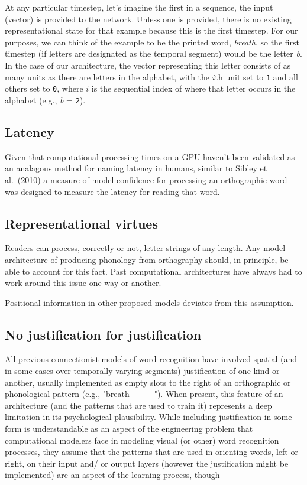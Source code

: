 \documentclass[
  american,
  man,floatsintext]{apa6}
\begin{document}
At any particular timestep, let's imagine the first in a sequence, the input (vector) is provided to the network. Unless one is provided, there is no existing representational state for that example because this is the first timestep. For our purposes, we can think of the example to be the printed word, \emph{breath}, so the first timestep (if letters are designated as the temporal segment) would be the letter \emph{b}. In the case of our architecture, the vector representing this letter consists of as many units as there are letters in the alphabet, with the \(i\)th unit set to \texttt{1} and all others set to \texttt{0}, where \(i\) is the sequential index of where that letter occurs in the alphabet (e.g., \emph{b} = \texttt{2}).

\hypertarget{latency}{%
\subsection{Latency}\label{latency}}

Given that computational processing times on a GPU haven't been validated as an analagous method for naming latency in humans, similar to Sibley et al.~(2010) a measure of model confidence for processing an orthographic word was designed to measure the latency for reading that word.

\hypertarget{representational-virtues}{%
\subsection{Representational virtues}\label{representational-virtues}}

Readers can process, correctly or not, letter strings of any length. Any model architecture of producing phonology from orthography should, in principle, be able to account for this fact. Past computational architectures have always had to work around this issue one way or another.

Positional information in other proposed models deviates from this assumption.

\hypertarget{no-justification-for-justification}{%
\subsection{No justification for justification}\label{no-justification-for-justification}}

All previous connectionist models of word recognition have involved spatial (and in some cases over temporally varying segments) justification of one kind or another, usually implemented as empty slots to the right of an orthographic or phonological pattern (e.g., "breath\_\_\_\_"). When present, this feature of an architecture (and the patterns that are used to train it) represents a deep limitation in its psychological plausibility. While including justification in some form is understandable as an aspect of the engineering problem that computational modelers face in modeling visual (or other) word recognition processes, they assume that the patterns that are used in orienting words, left or right, on their input and/ or output layers (however the justification might be implemented) are an aspect of the learning process, though
\end{document}
